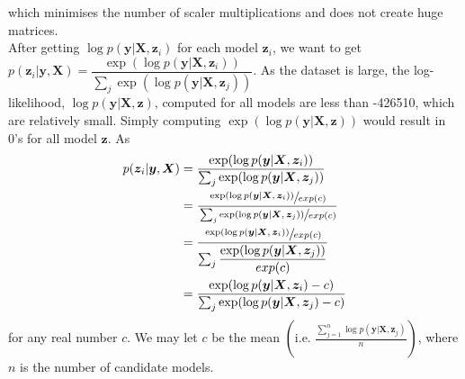 \documentclass[a4page]{article}
\begin{document}
	which minimises the number of scaler multiplications and does not create huge matrices.\\
	After getting $\log p(\bm{y}|\bm{X},\bm{z}_i)$ for each model $\bm{z}_i$, we want to get $p(\bm{z}_i|\bm{y},\bm{X}) = \dfrac{\exp(\log p(\bm{y}|\bm{X},\bm{z}_i))}{\sum_j \exp(\log p(\bm{y}|\bm{X},\bm{z}_j))}$. As the dataset is large, the log-likelihood, $\log p(\bm{y}|\bm{X},\bm{z})$, computed for all models are less than -426510, which are relatively small. Simply computing $\exp(\log p(\bm{y}|\bm{X},\bm{z}))$ would result in 0's for all model $\bm{z}$. As
	\begin{equation}
	\begin{split}	
	p(\bm{z}_i|\bm{y},\bm{X}) 
	&= \frac{\exp(\log p(\bm{y}|\bm{X},\bm{z}_i))}{\sum_j \exp(\log p(\bm{y}|\bm{X},\bm{z}_j))}\\
	&= \frac{\sfrac{\exp(\log p(\bm{y}|\bm{X},\bm{z}_i))}{exp(c)}}{\sfrac{\sum_j \exp(\log p(\bm{y}|\bm{X},\bm{z}_j))}{exp(c)}}\\
	&= \frac{\sfrac{\exp(\log p(\bm{y}|\bm{X},\bm{z}_i))}{exp(c)}}{\sum_j \dfrac{ \exp(\log p(\bm{y}|\bm{X},\bm{z}_j))}{exp(c)}}\\
	&= \frac{\exp(\log p(\bm{y}|\bm{X},\bm{z}_i) - c)}{\sum_j \exp(\log p(\bm{y}|\bm{X},\bm{z}_j) - c)}
	\label{lpy.p}
	\end{split}
	\end{equation}
	for any real number $c$. We may let $c$ be the mean $\left(\text{i.e. } \frac{\sum_{j=1}^n \log p(\bm{y}|\bm{X},\bm{z}_j)}{n}\right)$, where $n$ is the number of candidate models.
\end{document}

